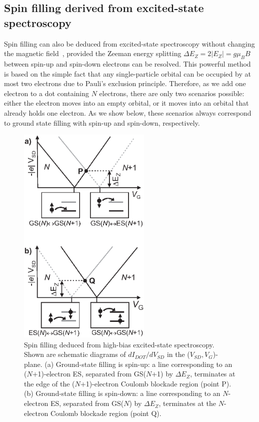 \documentclass[12pt,aps,nofootinbib]{revtex4-1}
\begin{document}
\subsection{Spin filling derived from excited-state spectroscopy}
Spin filling can also be deduced from excited-state spectroscopy
without changing the magnetic field~\cite{Cobden98}, provided the
Zeeman energy splitting $\Delta E_Z=2\left|E_Z\right|=g \mu_B B$
between spin-up and spin-down electrons can be resolved. This
powerful method is based on the simple fact that any
single-particle orbital can be occupied by at most two electrons
due to Pauli's exclusion principle. Therefore, as we add one
electron to a dot containing $N$ electrons, there are only two
scenarios possible: either the electron moves into an empty
orbital, or it moves into an orbital that already holds one
electron. As we show below, these scenarios always correspond to
ground state filling with spin-up and spin-down, respectively.

\begin{figure}[htb]
\begin{center}
\includegraphics[width=2.5in, clip=true]{hanson_fig06.eps}
\end{center}
\caption{\label{fig:ESspinfilling} Spin filling deduced from
high-bias excited-state spectroscopy. Shown are schematic diagrams
of $dI_{DOT}/dV_{SD}$ in the ($V_{SD},V_G$)-plane. (a)
Ground-state filling is spin-up: a line corresponding to an
($N$+1)-electron ES, separated from GS($N$+1) by $\Delta E_{Z}$,
terminates at the edge of the ($N$+1)-electron Coulomb blockade
region (point P). (b) Ground-state filling is spin-down: a line
corresponding to an $N$-electron ES, separated from GS($N$) by
$\Delta E_{Z}$, terminates at the $N$-electron Coulomb blockade
region (point Q).}
\end{figure}
\end{document}
